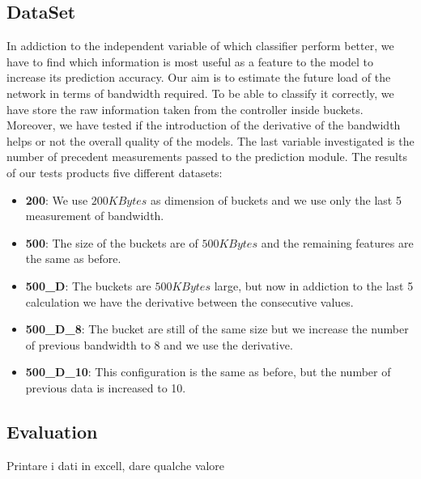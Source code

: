 \documentclass[12pt]{article}
\begin{document}
\subsection{DataSet}
In addiction to the independent variable of which classifier perform better, we have to find which information is most useful as a feature to the model to increase its prediction accuracy.
Our aim is to estimate the future load of the network in terms of bandwidth required. 
To be able to classify it correctly, we have store the raw information taken from the controller inside buckets. 
Moreover, we have tested if the introduction of the derivative of the bandwidth helps or not the overall quality of the models.
The last variable investigated is the number of precedent measurements passed to the prediction module.
The results of our tests products five different datasets:
\begin{itemize}
	\item \textbf{200}: We use $200 KBytes$ as dimension of buckets and we use only the last 5 measurement of bandwidth.
	
	\item \textbf{500}: The size of the buckets are of $500 KBytes$ and the remaining features are the same as before.
	
	\item \textbf{500\_D}: The buckets are $500 KBytes$ large, but now in addiction to the last 5 calculation we have the derivative between the consecutive values.

	\item \textbf{500\_D\_8}: The bucket are still of the same size but we increase the number of previous bandwidth to 8 and we use the derivative.
	\item \textbf{500\_D\_10}: This configuration is the same as before, but the number of previous data is increased to 10.
\end{itemize}


\subsection{Evaluation}

Printare i dati in excell, dare qualche valore

\newpage 
{}
\end{document}
